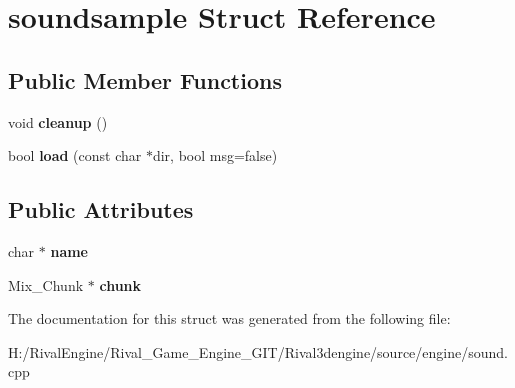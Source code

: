 \hypertarget{structsoundsample}{}\section{soundsample Struct Reference}
\label{structsoundsample}
\subsection*{Public Member Functions}
\begin{DoxyCompactItemize}
\item 
\mbox{\label{structsoundsample_a678920655818ec28c7114f40c2737d3b}} 
void {\bfseries cleanup} ()
\item 
\mbox{\label{structsoundsample_ac55121b35f119f9b9956b160004a2c1e}} 
bool {\bfseries load} (const char $\ast$dir, bool msg=false)
\end{DoxyCompactItemize}
\subsection*{Public Attributes}
\begin{DoxyCompactItemize}
\item 
\mbox{\label{structsoundsample_adb2997d2c710b15ea1eaad04aaaec6d5}} 
char $\ast$ {\bfseries name}
\item 
\mbox{\label{structsoundsample_ab4a819bcc4030a75ba756cc7f148dbe8}} 
Mix\+\_\+\+Chunk $\ast$ {\bfseries chunk}
\end{DoxyCompactItemize}


The documentation for this struct was generated from the following file\+:\begin{DoxyCompactItemize}
\item 
H\+:/\+Rival\+Engine/\+Rival\+\_\+\+Game\+\_\+\+Engine\+\_\+\+G\+I\+T/\+Rival3dengine/source/engine/sound.\+cpp\end{DoxyCompactItemize}

